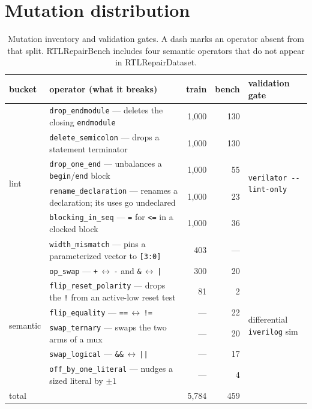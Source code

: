 \documentclass{article}
\newcommand{\code}[1]{\texttt{#1}}
\begin{document}
\section{Mutation distribution}\label{app:mutations}

\begin{table}[H]
\centering
\footnotesize
\setlength{\tabcolsep}{4pt}
\renewcommand{\arraystretch}{1.05}
\caption{Mutation inventory and validation gates. A dash marks an operator absent from that split.
RTLRepairBench includes four semantic operators that do not appear in RTLRepairDataset.}
\label{tab:mutations}
\begin{tabular}{@{}l>{\raggedright\arraybackslash}p{}rrl@{}}
\toprule
bucket & operator (what it breaks) & train & bench & validation gate \\
\midrule
\multirow{6}{*}{lint}
 & \code{drop\_endmodule} --- deletes the closing \code{endmodule}
   & 1{,}000 & 130 & \multirow{6}{*}{\code{verilator -{}-lint-only}} \\
 & \code{delete\_semicolon} --- drops a statement terminator
   & 1{,}000 & 130 & \\
 & \code{drop\_one\_end} --- unbalances a \code{begin}/\code{end} block
   & 1{,}000 & 55 & \\
 & \code{rename\_declaration} --- renames a declaration; its uses go undeclared
   & 1{,}000 & 23 & \\
 & \code{blocking\_in\_seq} --- \code{=} for \code{<=} in a clocked block
   & 1{,}000 & 36 & \\
 & \code{width\_mismatch} --- pins a parameterized vector to \code{[3:0]}
   & 403 & --- & \\
\midrule
\multirow{6}{*}{semantic}
 & \code{op\_swap} --- \code{+}\,$\leftrightarrow$\,\code{-} and \code{\&}\,$\leftrightarrow$\,\code{|}
   & 300 & 20 & \multirow{6}{*}{differential \code{iverilog} sim} \\
 & \code{flip\_reset\_polarity} --- drops the \code{!} from an active-low reset test
   & 81 & 2 & \\
 & \code{flip\_equality} --- \code{==}\,$\leftrightarrow$\,\code{!=}
   & --- & 22 & \\
 & \code{swap\_ternary} --- swaps the two arms of a mux
   & --- & 20 & \\
 & \code{swap\_logical} --- \code{\&\&}\,$\leftrightarrow$\,\code{||}
   & --- & 17 & \\
 & \code{off\_by\_one\_literal} --- nudges a sized literal by $\pm 1$
   & --- & 4 & \\
\midrule
total & & 5{,}784 & 459 & \\
\bottomrule
\end{tabular}
\end{table}
\end{document}
